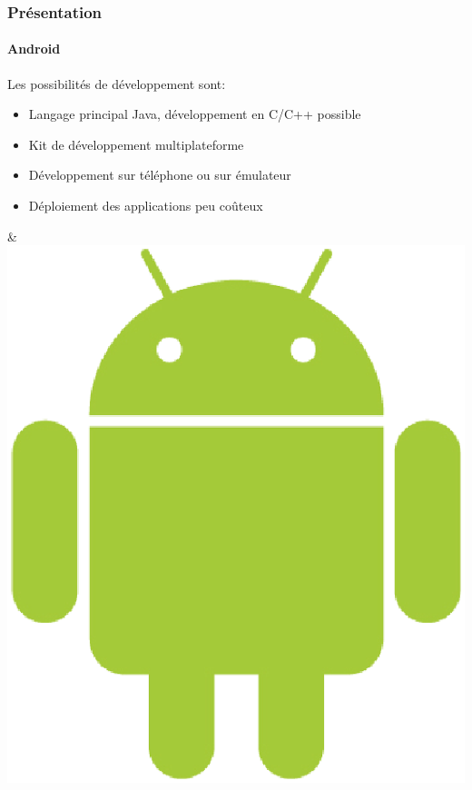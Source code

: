 \begin{frame}
\frametitle{Présentation}
\framesubtitle{Android}
	\begin{minipage}{8cm}
	Les possibilités de développement sont: \\ 

	\begin{itemize}
		\item Langage principal Java, développement en C/C++ possible
		\item Kit de développement multiplateforme
		\item Développement sur téléphone ou sur émulateur
		\item Déploiement des applications peu coûteux
	\end{itemize}
	\end{minipage} & \includegraphics[scale=0.2]{img/android.eps} 
\end{frame}




